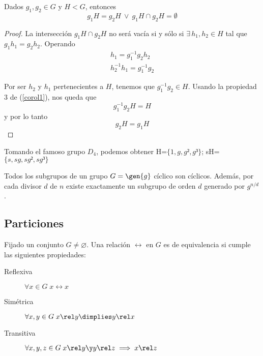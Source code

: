 \documentclass[nochap]{apuntes}
\begin{document}
  \begin{prop}
   Dados $g_{1}, g_{2}\in G$ y $H<G$, entonces \[ g_{1}H=g_{2}H \  \vee \ g_{1}H\cap g_{2}H=\emptyset \]
  \end{prop}
  
  \begin{proof}
   La intersección $g_{1}H\cap g_{2}H$ no será vacía si y sólo si $\exists\, h_{1},h_{2} \in H$ tal que $g_{1}h_{1}=g_{2}h_{2}$. Operando 
   \begin{gather*}
   h_{1}=g_{1}^{-1}g_{2}h_{2} \\
   h_{2}^{-1}h_{1}=g_{1}^{-1}g_{2}
   \end{gather*}
   
   Por ser $h_2$ y $h_1$ pertenecientes a $H$, tenemos que $g_{1}^{-1}g_{2} \in H$. Usando la propiedad 3 de (\ref{corol1}), nos queda que
    \[ g_{1}^{-1}g_{2}H=H  \] y por lo tanto \[ g_{2}H=g_{1}H \]
  \end{proof}
  
  \begin{example}
   Tomando el famoso grupo $D_{4}$, podemos obtener H=$\{1,g,g²,g³\}$; sH=$\{s,sg,sg²,sg³\}$
  \end{example}
  
  \begin{theorem} Todos los subgrupos de un grupo $G=\gen{g}$ cíclico son cíclicos. Además, por cada divisor $d$ de $n$ existe exactamente un subgrupo de orden $d$ generado por $g^{n/d}$.
   \end{theorem}
  
\subsection{Particiones}
\begin{defn}
   Fijado un conjunto $G\neq\varnothing$. Una relación $\rel$ en $G$ es de equivalencia si cumple las siguientes propiedades:
  
   \begin{description}   
    \item[Reflexiva] $\forall x\in G \;  x\rel x$
    \item[Simétrica] $\forall x,y \in G\;  x\rel y \dimplies y \rel x$
    \item[Transitiva] $\forall x,y,z \in G\;  x\rel y \y  y\rel z \implies x\rel z$
   \end{description}  
  \end{defn}
 
\end{document}
